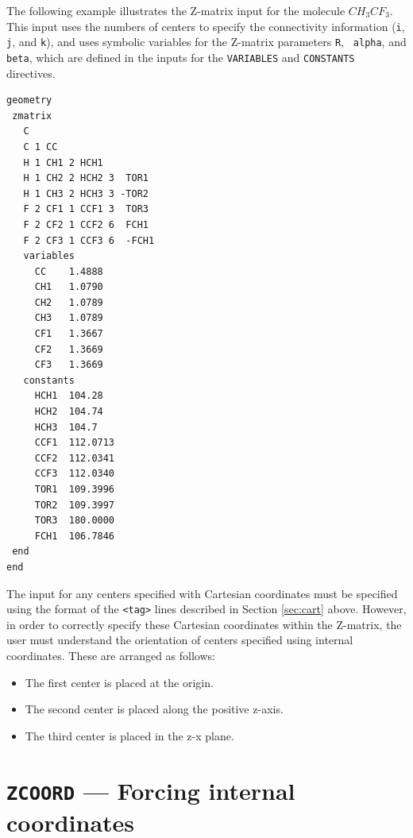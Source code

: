The following example illustrates the Z-matrix input for the molecule
$CH_3CF_3$.  This input uses the numbers of centers to specify
the connectivity information (\verb+i+, \verb+j+, and \verb+k+), and
uses symbolic variables for the Z-matrix parameters {\tt R}, {\tt
  alpha}, and {\tt beta}, which are defined in the inputs for the
\verb+VARIABLES+ and
\verb+CONSTANTS+ directives.

\begin{verbatim}
geometry 
 zmatrix
   C 
   C 1 CC 
   H 1 CH1 2 HCH1 
   H 1 CH2 2 HCH2 3  TOR1 
   H 1 CH3 2 HCH3 3 -TOR2 
   F 2 CF1 1 CCF1 3  TOR3 
   F 2 CF2 1 CCF2 6  FCH1 
   F 2 CF3 1 CCF3 6  -FCH1
   variables
     CC    1.4888 
     CH1   1.0790 
     CH2   1.0789  
     CH3   1.0789  
     CF1   1.3667 
     CF2   1.3669 
     CF3   1.3669
   constants
     HCH1  104.28 
     HCH2  104.74 
     HCH3  104.7 
     CCF1  112.0713 
     CCF2  112.0341 
     CCF3  112.0340 
     TOR1  109.3996 
     TOR2  109.3997 
     TOR3  180.0000 
     FCH1  106.7846 
 end   
end
\end{verbatim}

The input for any centers specified with Cartesian coordinates must
be specified using the format of the \verb+<tag>+ lines described
in Section \ref{sec:cart} above.  However, in
order to correctly specify these Cartesian coordinates 
within the Z-matrix, the user must
understand the orientation of centers specified using
internal coordinates.  These are arranged as follows:
\begin{itemize}
\item The first center is placed at the origin.
\item The second center is placed along the positive z-axis.
\item The third center is placed in the z-x plane.
\end{itemize}

\section{{\tt ZCOORD} --- Forcing internal coordinates}
\label{sec:zcoord}

